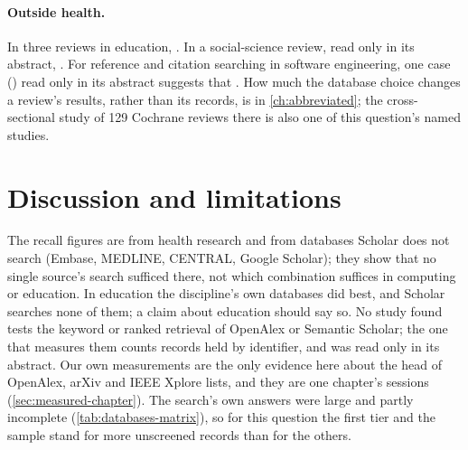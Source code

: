 \paragraph{Outside health.}
\begingroup\sloppy
In three reviews in education, .
In a social-science review, read only in its abstract,
.
For reference and citation searching in software engineering, one case
() read
only in its abstract suggests that .
How much the database choice changes a review's results, rather than its
records, is in \cref{ch:abbreviated}; the cross-sectional study of 129
Cochrane reviews there \parencite{Hartling2016} is also one of this
question's named studies.
\par\endgroup

\section{Discussion and limitations}
\label{sec:databases-discussion}

The recall figures are from health research and from databases Scholar
does not search (Embase, MEDLINE, CENTRAL, Google Scholar); they show that
no single source's search sufficed there, not which combination suffices in
computing or education.
In education the discipline's own databases did best, and Scholar
searches none of them; a claim about education should say so.
No study found tests the keyword or ranked retrieval of OpenAlex or
Semantic Scholar; the one that measures them counts records held by
identifier, and was read only in its abstract.
Our own measurements are the only evidence here about the head of
OpenAlex, arXiv and IEEE Xplore lists, and they are one chapter's
sessions (\cref{sec:measured-chapter}).
The search's own answers were large and partly incomplete
(\cref{tab:databases-matrix}), so for this question the first tier and the
sample stand for more unscreened records than for the others.

